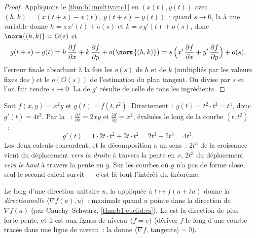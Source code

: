 \begin{proof}
Appliquons le \cref{thm:b1:multivar:c1} en $(x(t), y(t))$ avec $(h, k) =
(x(t+s) - x(t),\, y(t+s) - y(t))$~: quand $s \to 0$, la
 à une variable donne $h = s\,x'(t) + o(s)$ et $k =
s\,y'(t) + o(s)$, donc $\norm{(h, k)} = O(s)$ et
\[
g(t+s) - g(t)
= h\,\frac{\partial f}{\partial x} + k\,\frac{\partial
f}{\partial y} + o\bigl(\norm{(h,k)}\bigr)
= s\,\Bigl(x'\,\frac{\partial f}{\partial x} +
y'\,\frac{\partial f}{\partial y}\Bigr) + o(s) ,
\]
l'erreur finale absorbant à la fois les $o(s)$ de $h$ et de $k$
(multipliés par les valeurs fixes des ) et le
$o(O(s))$ de l'estimation du plan tangent. On divise par $s$ et
l'on fait tendre $s \to 0$. La  de $g'$ résulte de celle
de tous les ingrédients.
\end{proof}

\begin{example}
\label{ex:b1:multivar:chainrun}
Soit $f(x, y) = x^2 y$ et $g(t) = f(t, t^2)$. Directement~: $g(t) =
t^2\cdot t^2 = t^4$, donc $g'(t) = 4t^3$. Par la ~: $\frac{\partial f}{\partial x} = 2xy$ et $\frac{\partial
f}{\partial y} = x^2$, évaluées le long de la courbe $(t, t^2)$~:
\[
g'(t) = 1\cdot 2t\cdot t^2 + 2t\cdot t^2 = 2t^3 + 2t^3 = 4t^3 .
\]
Les deux calculs concordent, et la décomposition a un sens~: $2t^3$
de la croissance vient du déplacement \emph{vers la droite} à
travers la pente en $x$, $2t^3$ du déplacement \emph{vers le haut}
à travers la pente en $y$. Sur les courbes où $g$ n'a pas de forme
close, seul le second calcul survit --- c'est là tout l'intérêt du
théorème.
\end{example}

\begin{remark}
Le long d'une direction unitaire $u$, la 
appliquée à $t \mapsto f(a + tu)$ donne la \emph{
directionnelle} $\langle \nabla f(a), u\rangle$~: maximale quand
$u$ pointe dans la direction de $\nabla f(a)$ (par
Cauchy--Schwarz, \cref{thm:b1:euclid:cs}). Le  est la
direction de plus forte pente, et il est  aux lignes de
niveau $\{f = c\}$ (dériver $f$ le long d'une courbe tracée dans
une ligne de niveau~: la  donne $\langle\nabla
f,\, \text{tangente}\rangle = 0$).
\end{remark}

